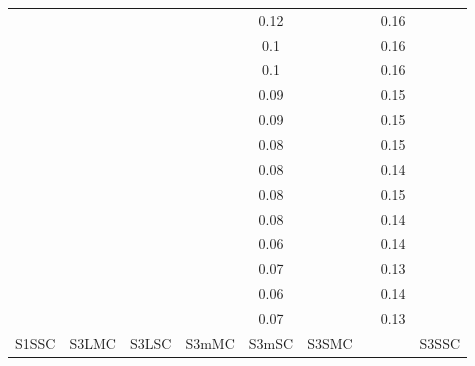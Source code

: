 \documentclass[AutoFakeBold]{LZUThesis}
\begin{document}
\begin{longtable}{ccccccccc}
       &        &        &       & 0.12  &      &       & 0.16  &      \\
       &        &        &       & 0.1   &      &       & 0.16  &      \\
       &        &        &       & 0.1   &      &       & 0.16  &      \\
       &        &        &       & 0.09  &      &       & 0.15  &      \\
       &        &        &       & 0.09  &      &       & 0.15  &      \\
       &        &        &       & 0.08  &      &       & 0.15  &      \\
       &        &        &       & 0.08  &      &       & 0.14  &      \\
       &        &        &       & 0.08  &      &       & 0.15  &      \\
       &        &        &       & 0.08  &      &       & 0.14  &      \\
       &        &        &       & 0.06  &      &       & 0.14  &      \\
       &        &        &       & 0.07  &      &       & 0.13  &      \\
       &        &        &       & 0.06  &      &       & 0.14  &      \\
       &        &        &       & 0.07  &      &       & 0.13  &      \\
    
    \toprule
    S1SSC & S3LMC & S3LSC & S3mMC & S3mSC & S3SMC &      &      & S3SSC \\
    

\end{longtable}
\end{document}
